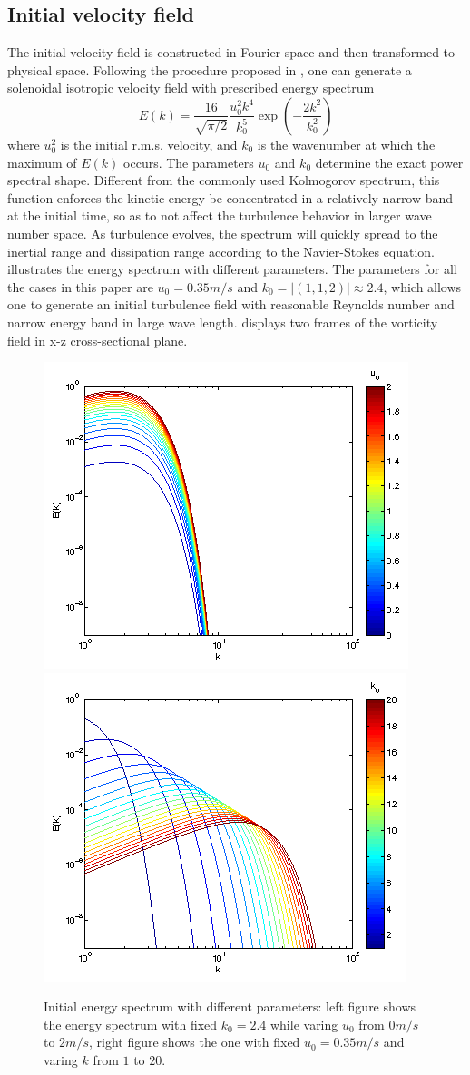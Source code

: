 \documentclass[draft,jgrga]{AGUTeX}
\begin{document}
\begin{article}
\subsection{Initial velocity field}   
The initial velocity field is constructed in Fourier space and then transformed to physical space. Following the procedure proposed in \cite{Rogallo81}, one can generate a solenoidal isotropic velocity field with prescribed energy spectrum \cite{Rosales05}
\begin{equation}
E(k) = \frac{16}{\sqrt{\pi/2}}\frac{u_0^2k^4}{k_0^5}\exp(-\frac{2k^2}{k_0^2})
\end{equation}
where $u_0^2$ is the initial r.m.s. velocity, and $k_0$ is the wavenumber at which the maximum of $E(k)$ occurs. The parameters $u_0$ and $k_0$ determine the exact power spectral shape. Different from the commonly used Kolmogorov spectrum, this function enforces the kinetic energy be concentrated in a relatively narrow band at the initial time, so as to not affect the turbulence behavior in larger wave number space. As turbulence evolves, the spectrum will quickly spread to the inertial range and dissipation range according to the Navier-Stokes equation.  illustrates the energy spectrum with different parameters. The parameters for all the cases in this paper are $u_0 = 0.35m/s$ and $k_0 = |(1,1,2)| \approx 2.4$, which allows one to generate an initial turbulence field with reasonable Reynolds number and narrow energy band in large wave length.  displays two frames of the vorticity field in x-z cross-sectional plane.
\begin{figure}\centering
\includegraphics[width=0.48\linewidth]{Figures/eng_spr_u}
\includegraphics[width=0.48\linewidth]{Figures/eng_spr_k}
\caption{Initial energy spectrum with different parameters: left figure shows the energy spectrum with fixed $k_0 = 2.4$ while varing $u_0$ from $0m/s$ to $2m/s$, right figure shows the one with fixed $u_0 = 0.35m/s$ and varing $k$ from $1$ to $20$.\label{fig:eng_spr}}
\end{figure}


\end{article}
\end{document}
